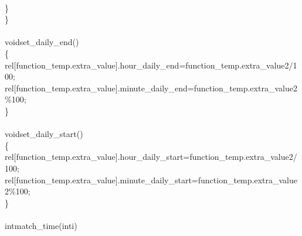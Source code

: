 \documentclass[a4paper, 12pt]{article}
\newcommand\SPC{\hspace*{0.6em}}
\newcommand{\CppAIdentifier}[1]{\textcolor[rgb]{0,1,0}{#1}}
\newcommand{\CppANumber}[1]{\textcolor[rgb]{0,0,1}{#1}}
\newcommand{\CppAReservedWord}[1]{\textcolor[rgb]{0,0.5,0}{#1}}
\newcommand{\CppASpace}[1]{\textcolor[rgb]{1,1,1}{\colorbox[rgb]{0,0,0}{#1}}}
\newcommand{\CppASymbol}[1]{\textcolor[rgb]{1,0,0}{#1}}
\begin{document}
\begin{ttfamily}
\CppASpace{\SPC \SPC }\\
\CppASpace{\SPC \SPC }\CppASymbol{\}}\\
\CppASymbol{\}}\\
\\
\CppAReservedWord{void}\CppASpace{\SPC }\CppAIdentifier{set\_daily\_end}\CppASymbol{(}\CppASymbol{)}\\
\CppASymbol{\{}\\
\CppASpace{\SPC \SPC }\CppAIdentifier{rel}\CppASymbol{[}\CppAIdentifier{function\_temp}\CppASymbol{.}\CppAIdentifier{extra\_value}\CppASymbol{]}\CppASymbol{.}\CppAIdentifier{hour\_daily\_end}\CppASpace{\SPC }\CppASymbol{=}\CppASpace{\SPC }\CppAIdentifier{function\_temp}\CppASymbol{.}\CppAIdentifier{extra\_value2}\CppASymbol{/}\CppANumber{100}\CppASymbol{;}\\
\CppASpace{\SPC \SPC }\CppAIdentifier{rel}\CppASymbol{[}\CppAIdentifier{function\_temp}\CppASymbol{.}\CppAIdentifier{extra\_value}\CppASymbol{]}\CppASymbol{.}\CppAIdentifier{minute\_daily\_end}\CppASpace{\SPC }\CppASymbol{=}\CppASpace{\SPC }\CppAIdentifier{function\_temp}\CppASymbol{.}\CppAIdentifier{extra\_value2}\CppASymbol{\%}\CppANumber{100}\CppASymbol{;}\\
\CppASymbol{\}}\\
\\
\CppAReservedWord{void}\CppASpace{\SPC }\CppAIdentifier{set\_daily\_start}\CppASymbol{(}\CppASymbol{)}\\
\CppASymbol{\{}\\
\CppASpace{\SPC \SPC }\CppAIdentifier{rel}\CppASymbol{[}\CppAIdentifier{function\_temp}\CppASymbol{.}\CppAIdentifier{extra\_value}\CppASymbol{]}\CppASymbol{.}\CppAIdentifier{hour\_daily\_start}\CppASpace{\SPC }\CppASymbol{=}\CppASpace{\SPC }\CppAIdentifier{function\_temp}\CppASymbol{.}\CppAIdentifier{extra\_value2}\CppASymbol{/}\CppANumber{100}\CppASymbol{;}\\
\CppASpace{\SPC \SPC }\CppAIdentifier{rel}\CppASymbol{[}\CppAIdentifier{function\_temp}\CppASymbol{.}\CppAIdentifier{extra\_value}\CppASymbol{]}\CppASymbol{.}\CppAIdentifier{minute\_daily\_start}\CppASpace{\SPC }\CppASymbol{=}\CppASpace{\SPC }\CppAIdentifier{function\_temp}\CppASymbol{.}\CppAIdentifier{extra\_value2}\CppASymbol{\%}\CppANumber{100}\CppASymbol{;}\\
\CppASymbol{\}}\\
\\
\CppAReservedWord{int}\CppASpace{\SPC }\CppAIdentifier{match\_time}\CppASymbol{(}\CppAReservedWord{int}\CppASpace{\SPC }\CppAIdentifier{i}\CppASymbol{)}\\

\end{ttfamily}
\end{document}
